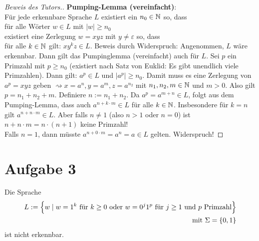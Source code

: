 \documentclass[12pt,a4paper]{article}
\begin{document}
\begin{proof}[Beweis des Tutors.]\enter
	\textbf{Pumping-Lemma (vereinfacht)}:\\
	Für jede erkennbare Sprache $L$ existiert ein $n_0\in\N$ so, dass\\
	für alle Wörter $w\in L$ mit $|w|\geq n_0$\\
	existiert eine Zerlegung $w=xyz$ mit $y\neq\varepsilon$ so, dass\\
	für alle $k\in\N$ gilt: $xy^kz\in L$.\nl
	Beweis durch Widerspruch:
	Angenommen, $L$ wäre erkennbar. Dann gilt das Pumpinglemma (vereinfacht) auch für $L$.
	Sei $p$ ein Primzahl mit $p\geq n_0$ (existiert nach Satz von Euklid: Es gibt unendlich viele Primzahlen).
	Dann gilt:
	$a^p\in L$ und $|a^p|\geq n_0$.
	Damit muss es eine Zerlegung von $a^p=xyz$ geben $\rightsquigarrow x=a^n,y=a^m,z=a^{n_2}$ mit $n_1,n_2,m\in\N$ und $m>0$.
	Also gilt $p=n_1+n_2+m$. 
	Definiere $n:=n_1+n_2$.
	Da $a^p=a^{m+n}\in L$, folgt aus dem Pumping-Lemma,
	dass auch $a^{n+k\cdot m}\in L$ für alle $k\in\N$.
	Insbesondere für $k=n$ %
	gilt $a^{n+n\cdot m}\in L$.
	Aber falls $n\neq1$ (also $n>1$ oder $n=0$) ist $n+n\cdot m=n\cdot(n+1)$ keine Primzahl!\\
	Falls $n=1$, dann müsste $a^{n+0\cdot m}=a^n=a\in L$ gelten. Widerspruch!
\end{proof}

\section*{Aufgabe 3}
Die Sprache
\begin{align*}
	L:=\Big\lbrace w\mid w=1^k\text{ für }k\geq0\text{ oder }w=0^j1^p\text{ für }j\geq1\text{ und }p\text{ Primzahl}\Big\rbrace\\
	\mit\Sigma=\lbrace0,1\rbrace
\end{align*}
ist nicht erkennbar.
\end{document}
